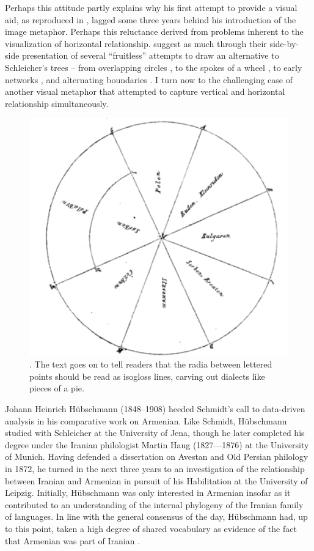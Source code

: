 \documentclass[output=paper]{langscibook}
\begin{document}
Perhaps this attitude partly explains why his first attempt to provide a visual aid, as reproduced in , lagged some three years behind his introduction of the image metaphor. Perhaps this reluctance derived from problems inherent to the visualization of horizontal relationship. \citet[116--117]{GeislerList2013} suggest as much through their side-by-side presentation of several ``fruitless'' attempts to draw an alternative to Schleicher's trees -- from overlapping circles \citep{Hirt1905}, to the spokes of a wheel \citep{Meillet1908}, to early networks \citep{bonfante1931}, and alternating boundaries \citep{Bloomfield1933}. I turn now to the challenging case of another visual metaphor that attempted to capture vertical and horizontal relationship simultaneously.

\begin{figure}
    \centering
    \includegraphics[scale=1]{figures/schmidt1875.png}
    \caption{\citet[199]{Schmidt1875}. The text goes on to tell readers that the radia between lettered points should be read as isogloss lines, carving out dialects like pieces of a pie.}
    \label{fig:kaplan:schmidt}
\end{figure}

Johann Heinrich Hübschmann (1848--1908) heeded Schmidt's call to data-driv\-en analysis in his comparative work on Armenian. Like Schmidt, Hübschmann studied with Schleicher at the University of Jena, though he later completed his degree under the Iranian philologist Martin Haug (1827—1876) at the University of Munich. Having defended a dissertation on Avestan and Old Persian philology in 1872, he turned in the next three years to an investigation of the relationship between Iranian and Armenian in pursuit of his Habilitation at the University of Leipzig. Initially, Hübschmann was only interested in Armenian insofar as it contributed to an understanding of the internal phylogeny of the Iranian family of languages. In line with the general consensus of the day, Hübschmann had, up to this point, taken a high degree of shared vocabulary as evidence of the fact that Armenian was part of Iranian \citep{Schmitt1976}.
\end{document}
